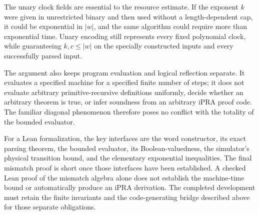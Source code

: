The unary clock fields are essential to the resource estimate.  If the
exponent \(k\) were given in unrestricted binary and then used without a
length-dependent cap, it could be exponential in \(|w|\), and the same
algorithm could require more than exponential time.  Unary encoding still
represents every fixed polynomial clock, while guaranteeing \(k,c\leq|w|\)
on the specially constructed inputs and every successfully parsed input.

The argument also keeps program evaluation and logical reflection separate.
It evaluates a specified machine for a specified finite number of steps;
it does not evaluate arbitrary primitive-recursive definitions uniformly,
decide whether an arbitrary theorem is true, or infer soundness from an
arbitrary iPRA proof code.  The familiar diagonal phenomenon therefore poses
no conflict with the totality of the bounded evaluator.

For a Lean formalization, the key interfaces are the word constructor,
its exact parsing theorem, the bounded evaluator, its Boolean-valuedness,
the simulator's physical transition bound, and the elementary exponential
inequalities.  The final mismatch proof is short once those interfaces have
been established.  A checked Lean proof of the mismatch algebra alone does
not establish the machine-time bound or automatically produce an iPRA
derivation.  The completed development must retain the finite invariants and
the code-generating bridge described above for those separate obligations.

